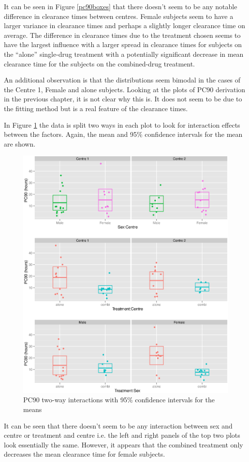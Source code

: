 It can be seen in Figure \ref{pc90boxes} that there doesn't seem to be any notable difference in clearance times between centres. Female subjects seem to have a larger variance in clearance times and perhaps a slightly longer clearance time on average. The difference in clearance times due to the treatment chosen seems to have the largest influence with a larger spread in clearance times for subjects on the ``alone'' single-drug treatment with a potentially significant decrease in mean clearance time for the subjects on the combined-drug treatment.

An additional observation is that the distributions seem bimodal in the cases of the Centre 1, Female and alone subjects. Looking at the plots of PC90 derivation in the previous chapter, it is not clear why this is. It does not seem to be due to the fitting method but is a real feature of the clearance times.

In Figure \ref{pc90interaction} the data is split two ways in each plot to look for interaction effects between the factors. Again, the mean and 95\% confidence intervals for the mean are shown.
\begin{figure}[p]
\includegraphics[width=150mm]{pc90interaction.eps} 
\caption{PC90 two-way interactions with 95\% confidence intervals for the means}
\label{pc90interaction}
\end{figure}
It can be seen that there doesn't seem to be any interaction between sex and centre or treatment and centre i.e. the left and right panels of the top two plots look essentially the same. However, it appears that the combined treatment only decreases the mean clearance time for female subjects.

